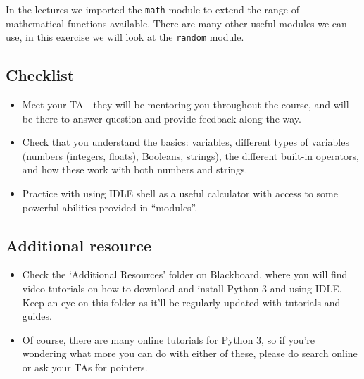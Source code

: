 \documentclass[12pt]{article}
\begin{document}
\begin{Exercise}[title=Importing Modules]

    In the lectures we imported the {\tt math} module to extend the range of mathematical functions available. There are many other useful modules we can use, in this exercise we will look at the {\tt random} module.
    \vspace{-\baselineskip}
\end{Exercise}

\subsection*{Checklist}
\begin{itemize}
    \item Meet your TA - they will be mentoring you throughout the course, and will be there to answer question and provide feedback along the way.
	\item Check that you understand the basics: variables, different types of variables (numbers (integers, floats), Booleans, strings), the different built-in operators, and how these work with both numbers and strings.
	\item Practice with using IDLE shell as a useful calculator with access to some powerful abilities provided in ``modules''.
\end{itemize}

\subsection*{Additional resource}
\begin{itemize}
    \item Check the `Additional Resources' folder on Blackboard, where you will find video tutorials on how to download and install Python 3 and using IDLE. Keep an eye on this folder as it'll be regularly updated with tutorials and guides.
	\item Of course, there are many online tutorials for Python 3, so if you're wondering what more you can do with either of these, please do search online or ask your TAs for pointers.
\end{itemize}
\end{document}
